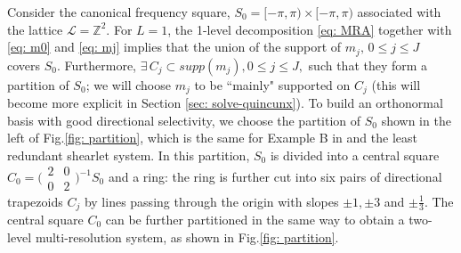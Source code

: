 Consider the canonical frequency square, $S_0 = [-\pi,\pi)\times[-\pi,\pi)$ associated with the lattice $\mathcal{L} = \mathbb{Z}^2$. 
For $L=1$, the 1-level decomposition \eqref{eq: MRA} together with \eqref{eq: m0} and \eqref{eq: mj} implies that the union of the support of $m_j,\,0\leq j\leq J$ covers $S_0$.
Furthermore, $\exists\, C_j\subset supp(m_j), 0\leq j\leq J,$ such that they form a partition of $S_0$; we will choose $m_j$ to be ``mainly" supported on $C_j$ (this will become more explicit in Section \ref{sec: solve-quincunx}).
To build an orthonormal basis with good directional selectivity, we choose the partition of $S_0$ shown in the left of Fig.\ref{fig: partition}, which is the same for Example B in \cite{durand2007} and the least redundant shearlet system. In this partition, $S_0$ is divided into a central square $C_0 = \bigl(\begin{smallmatrix} 2&0\\0&2\end{smallmatrix}\bigr)^{-1}S_0$ and a ring: the ring is further cut into six pairs of directional trapezoids $C_j$ by lines passing through the origin with slopes $\pm 1, \pm 3$ and $\pm \frac{1}{3}$. The central square $C_0$ can be further partitioned in the same way to obtain a two-level multi-resolution system, as shown in Fig.\ref{fig: partition}. 



